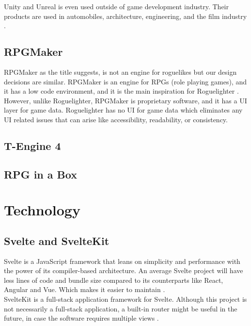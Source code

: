 \documentclass{article}
\begin{document}
Unity and Unreal is even used outside of game development industry. Their products are used in automobiles, architecture, engineering, and the film industry \cite{unity}\cite{unity-industry}\cite{unreal}.

\subsection{RPGMaker}
RPGMaker as the title suggests, is not an engine for roguelikes but our design decisions are similar. RPGMaker is an engine for RPGs (role playing games), and it has a low code environment, and it is the main inspiration for Roguelighter \cite{rpgmaker}. \\

However, unlike Roguelighter, RPGMaker is proprietary software, and it has a UI layer for game data. Roguelighter has no UI for game data which eliminates any UI related issues that can arise like accessibility, readability, or consistency.\\ 

\subsection{T-Engine 4}

\subsection{RPG in a Box}
 
\section{Technology}
\subsection{Svelte and SvelteKit}
Svelte is a JavaScript framework that leans on simplicity and performance with the power of its compiler-based architecture. An average Svelte project will have less lines of code and bundle size compared to its counterparts like React, Angular and Vue. Which makes it easier to maintain \cite{svelte-less}.\\

SvelteKit is a full-stack application framework for Svelte. Although this project is not necessarily a full-stack application, a built-in router might be useful in the future, in case the software requires multiple views \cite{sveltekit}.
\end{document}
